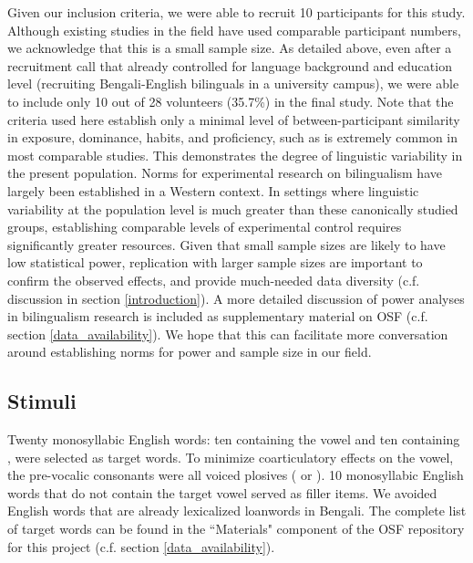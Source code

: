 \documentclass[12 pt]{article}
\newcommand{\nt}[1]{\textipa{[#1]}} %
\begin{document}
Given our inclusion criteria, we were able to recruit 10 participants for this study. Although existing studies in the field have used comparable participant numbers, we acknowledge that this is a small sample size. As detailed above, even after a recruitment call that already controlled for language background and education level (recruiting Bengali-English bilinguals in a university campus), we were able to include only 10 out of 28 volunteers (35.7\%) in the final study. Note that the criteria used here establish only a minimal level of between-participant similarity in exposure, dominance, habits, and proficiency, such as is extremely common in most comparable studies. This demonstrates the degree of linguistic variability in the present population. Norms for experimental research on bilingualism have largely been established in a Western context. In settings where linguistic variability at the population level is much greater than these canonically studied groups, establishing comparable levels of experimental control requires significantly greater resources. Given that small sample sizes are likely to have low statistical power, replication with larger sample sizes are important to confirm the observed effects, and provide much-needed data diversity (c.f. discussion in section \ref{introduction}). A more detailed discussion of power analyses in bilingualism research is included as supplementary material on OSF (c.f. section \ref{data_availability}). We hope that this can facilitate more conversation around establishing norms for power and sample size in our field.  


\subsection{Stimuli}
Twenty monosyllabic English words: ten containing the vowel \nt{2} and ten containing \nt{\ae}, were selected as target words. To minimize coarticulatory effects on the vowel, the pre-vocalic consonants were all voiced plosives (\nt{b} or \nt{d}). 10 monosyllabic English words that do not contain the target vowel served as filler items. We avoided English words that are already lexicalized loanwords in Bengali. The complete list of target words can be found in the ``Materials" component of the OSF repository for this project (c.f. section \ref{data_availability}).
\end{document}
